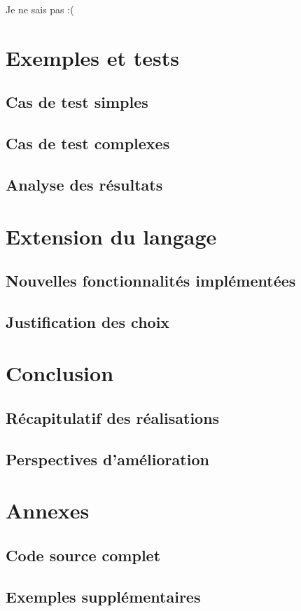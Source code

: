 \documentclass{article}
\begin{document}
Je ne sais pas :(

\section{Exemples et tests}
\subsection{Cas de test simples}
\subsection{Cas de test complexes}
\subsection{Analyse des résultats}

\section{Extension du langage}
\subsection{Nouvelles fonctionnalités implémentées}
\subsection{Justification des choix}

\section{Conclusion}
\subsection{Récapitulatif des réalisations}
\subsection{Perspectives d'amélioration}

\section{Annexes}
\subsection{Code source complet}
\subsection{Exemples supplémentaires}
\end{document}

